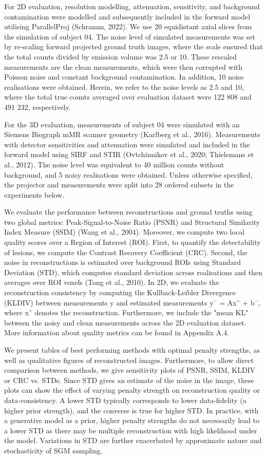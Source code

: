 \documentclass{article}
\begin{document}
For 2D evaluation, resolution modelling, attenuation, sensitivity, and background contamination were modelled and subsequently included in the forward model utilising ParallelProj (Schramm, 2022). We use 20 equidistant axial slices from the simulation of subject 04. The noise level of simulated measurements was set by re-scaling forward projected ground truth images, where the scale ensured that the total counts divided by emission volume was 2.5 or 10. These rescaled measurements are the clean measurements, which were then corrupted with Poisson noise and constant background contamination. In addition, 10 noise realisations were obtained. Herein, we refer to the noise levels as 2.5 and 10, where the total true counts averaged over evaluation dataset were 122 808 and 491 232, respectively.

For the 3D evaluation, measurements of subject 04 were simulated with an Siemens Biograph mMR scanner geometry (Karlberg et al., 2016). Measurements with detector sensitivities and attenuation were simulated and included in the forward model using SIRF and STIR (Ovtchinnikov et al., 2020; Thielemans et al., 2012). The noise level was equivalent to 40 million counts without background, and 5 noisy realisations were obtained. Unless otherwise specified, the projector and measurements were split into 28 ordered subsets in the experiments below.

We evaluate the performance between reconstructions and ground truths using two global metrics: Peak-Signal-to-Noise Ratio (PSNR) and Structural Similarity Index Measure (SSIM) (Wang et al., 2004). Moreover, we compute two local quality scores over a Region of Interest (ROI). First, to quantify the detectability of lesions, we compute the Contrast Recovery Coefficient (CRC). Second, the noise in reconstructions is estimated over background ROIs using Standard Deviation (STD), which computes standard deviation across realisations and then averages over ROI voxels (Tong et al., 2010). In 2D, we evaluate the reconstruction consistency by computing the Kullback-Leibler Divergence (KLDIV) between measurements y and estimated measurements y¯ = Axˆ + b¯, where xˆ denotes the reconstruction. Furthermore, we include the "mean KL" between the noisy and clean measurements across the 2D evaluation dataset. More information about quality metrics can be found in Appendix A.4.

We present tables of best performing methods with optimal penalty strengths, as well as qualitative figures of reconstructed images. Furthermore, to allow direct comparison between methods, we give sensitivity plots of PSNR, SSIM, KLDIV or CRC vs. STDs. Since STD gives an estimate of the noise in the image, these plots can show the effect of varying penalty strength on reconstruction quality or data-consistency. A lower STD typically corresponds to lower data-fidelity (a higher prior strength), and the converse is true for higher STD. In practice, with a generative model as a prior, higher penalty strengths do not necessarily lead to a lower STD as there may be multiple reconstruction with high likelihood under the model. Variations in STD are further exacerbated by approximate nature and stochasticity of SGM sampling.
\end{document}
